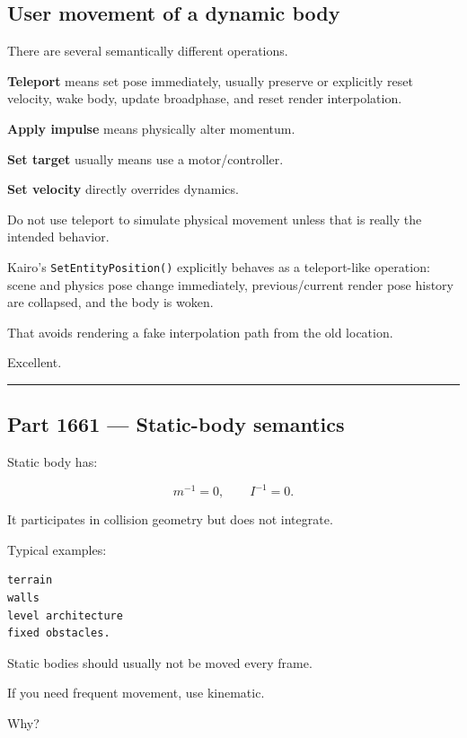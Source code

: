 \subsection{User movement of a dynamic body}\label{06-engine-ii-ch037-user-movement-of-a-dynamic-body}

There are several semantically different operations.

\textbf{Teleport} means set pose immediately, usually preserve or explicitly reset velocity, wake body, update broadphase, and reset render interpolation.

\textbf{Apply impulse} means physically alter momentum.

\textbf{Set target} usually means use a motor/controller.

\textbf{Set velocity} directly overrides dynamics.

Do not use teleport to simulate physical movement unless that is really the intended behavior.

Kairo's \texttt{SetEntityPosition()} explicitly behaves as a teleport-like operation: scene and physics pose change immediately, previous/current render pose history are collapsed, and the body is woken.

That avoids rendering a fake interpolation path from the old location.

Excellent.

\begin{center}\rule{0.5\linewidth}{0.5pt}\end{center}

\subsection{Part 1661 --- Static-body semantics}\label{06-engine-ii-ch037-part-1661-static-body-semantics}

Static body has:

\[
m^{-1}=0,
\qquad
I^{-1}=0.
\]

It participates in collision geometry but does not integrate.

Typical examples:

\begin{verbatim}
terrain
walls
level architecture
fixed obstacles.
\end{verbatim}

Static bodies should usually not be moved every frame.

If you need frequent movement, use kinematic.

Why?

